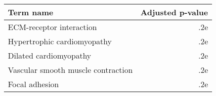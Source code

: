 \begin{tabular}{lr}
\toprule
                         Term name &  Adjusted p-value \\
\midrule
          ECM-receptor interaction &               .2e \\
       Hypertrophic cardiomyopathy &               .2e \\
            Dilated cardiomyopathy &               .2e \\
Vascular smooth muscle contraction &               .2e \\
                    Focal adhesion &               .2e \\
\bottomrule
\end{tabular}
